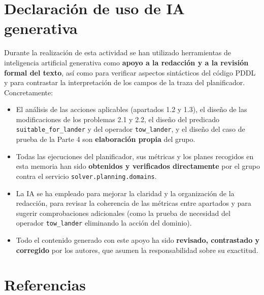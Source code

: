 \documentclass[12pt,a4paper]{article}
\begin{document}
\section{Declaraci\'on de uso de IA generativa}

Durante la realizaci\'on de esta actividad se han utilizado herramientas de
inteligencia artificial generativa como \textbf{apoyo a la redacci\'on y a la
revisi\'on formal del texto}, as\'i como para verificar aspectos sint\'acticos
del c\'odigo PDDL y para contrastar la interpretaci\'on de los campos de la
traza del planificador. Concretamente:

\begin{itemize}[leftmargin=*]
\item El an\'alisis de las acciones aplicables (apartados 1.2 y 1.3), el
dise\~no de las modificaciones de los problemas 2.1 y 2.2, el dise\~no del
predicado \texttt{suitable\_for\_lander} y del operador \texttt{tow\_lander},
y el dise\~no del caso de prueba de la Parte 4 son \textbf{elaboraci\'on
propia} del grupo.
\item Todas las ejecuciones del planificador, sus m\'etricas y los planes
recogidos en esta memoria han sido \textbf{obtenidos y verificados
directamente} por el grupo contra el servicio
\texttt{solver.planning.domains}.
\item La IA se ha empleado para mejorar la claridad y la organizaci\'on de la
redacci\'on, para revisar la coherencia de las m\'etricas entre apartados y
para sugerir comprobaciones adicionales (como la prueba de necesidad del
operador \texttt{tow\_lander} eliminando la acci\'on del dominio).
\item Todo el contenido generado con este apoyo ha sido \textbf{revisado,
contrastado y corregido} por los autores, que asumen la responsabilidad sobre
su exactitud.
\end{itemize}

\section*{Referencias}
\end{document}

